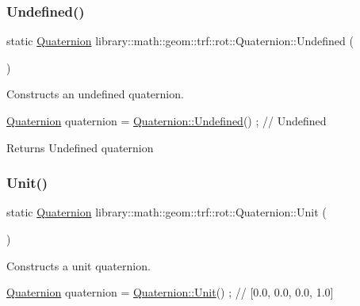 \subsubsection{\texorpdfstring{Undefined()}{Undefined()}}
{\footnotesize\ttfamily static \hyperlink{classlibrary_1_1math_1_1geom_1_1trf_1_1rot_1_1_quaternion}{Quaternion} library\+::math\+::geom\+::trf\+::rot\+::\+Quaternion\+::\+Undefined (\begin{DoxyParamCaption}{ }\end{DoxyParamCaption})\hspace{0.3cm}{\ttfamily [static]}}



Constructs an undefined quaternion. 


\begin{DoxyCode}
\hyperlink{classlibrary_1_1math_1_1geom_1_1trf_1_1rot_1_1_quaternion_aa7f459a08f5af38b9f7676a6bf36a21c}{Quaternion} quaternion = \hyperlink{classlibrary_1_1math_1_1geom_1_1trf_1_1rot_1_1_quaternion_aec27bd02d37ecfd50335d8f05978f4ba}{Quaternion::Undefined}() ; \textcolor{comment}{// Undefined}
\end{DoxyCode}


\begin{DoxyReturn}{Returns}
Undefined quaternion 
\end{DoxyReturn}
\mbox{\label{classlibrary_1_1math_1_1geom_1_1trf_1_1rot_1_1_quaternion_a27ad3f214371f7b566b1a4b75dcf9d0e}} 
\subsubsection{\texorpdfstring{Unit()}{Unit()}}
{\footnotesize\ttfamily static \hyperlink{classlibrary_1_1math_1_1geom_1_1trf_1_1rot_1_1_quaternion}{Quaternion} library\+::math\+::geom\+::trf\+::rot\+::\+Quaternion\+::\+Unit (\begin{DoxyParamCaption}{ }\end{DoxyParamCaption})\hspace{0.3cm}{\ttfamily [static]}}



Constructs a unit quaternion. 


\begin{DoxyCode}
\hyperlink{classlibrary_1_1math_1_1geom_1_1trf_1_1rot_1_1_quaternion_aa7f459a08f5af38b9f7676a6bf36a21c}{Quaternion} quaternion = \hyperlink{classlibrary_1_1math_1_1geom_1_1trf_1_1rot_1_1_quaternion_a27ad3f214371f7b566b1a4b75dcf9d0e}{Quaternion::Unit}() ; \textcolor{comment}{// [0.0, 0.0, 0.0, 1.0]}
\end{DoxyCode}


